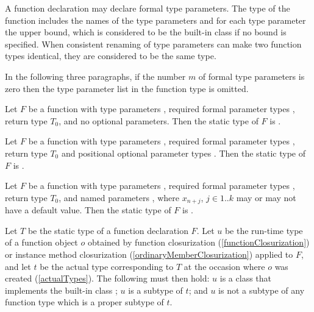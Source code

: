 \documentclass[makeidx]{article}
\begin{document}
\LMHash{}%
A function declaration may declare formal type parameters.
The type of the function includes the names of the type parameters
and for each type parameter the upper bound,
which is considered to be the built-in class  if no bound is specified.
When consistent renaming of type parameters can make two function types identical,
they are considered to be the same type.


\LMHash{}%
In the following three paragraphs,
if the number $m$ of formal type parameters is zero then
the type parameter list in the function type is omitted.

\LMHash{}%
Let $F$ be a function with
type parameters \TypeParametersStd,
required formal parameter types ,
return type $T_0$,
and no optional parameters.
Then the static type of $F$ is
.

\LMHash{}%
Let $F$ be a function with
type parameters \TypeParametersStd,
required formal parameter types ,
return type $T_0$
and positional optional parameter types .
Then the static type of $F$ is
.

\LMHash{}%
Let $F$ be a function with
type parameters \TypeParametersStd,
required formal parameter types ,
return type $T_0$,
and named parameters ,
where $x_{n+j}$, $j \in 1 .. k$ may or may not have a default value.
Then the static type of $F$ is
.

\LMHash{}%
Let $T$ be the static type of a function declaration $F$.
Let $u$ be the run-time type of a function object $o$ obtained by
function closurization
(\ref{functionClosurization})
or instance method closurization
(\ref{ordinaryMemberClosurization})
applied to $F$,
and let $t$ be the actual type corresponding to $T$
at the occasion where $o$ was created
(\ref{actualTypes}).
The following must then hold:
$u$ is a class that implements the built-in class \FUNCTION{};
$u$ is a subtype of $t$;
and $u$ is not a subtype of any function type which is a proper subtype of $t$.
\end{document}
